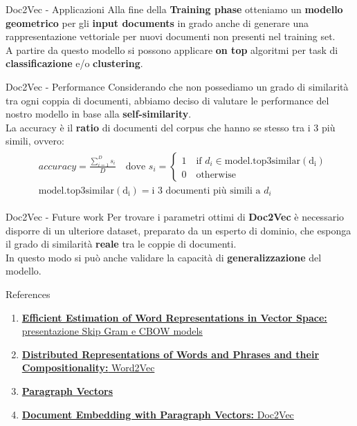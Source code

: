 \documentclass[british]{beamer}
\begin{document}
\begin{frame}{Doc2Vec - Applicazioni}
	Alla fine della \textbf{Training phase} otteniamo un \textbf{modello geometrico} per gli \textbf{input documents} in grado anche di generare una  rappresentazione vettoriale per nuovi documenti non presenti nel training set.\\
	A partire da questo modello si possono applicare \textbf{on top} algoritmi per task di \textbf{classificazione} e/o \textbf{clustering}. 
\end{frame}

\begin{frame}{Doc2Vec - Performance}
	Considerando che non possediamo un grado di similarit\`{a} tra ogni coppia di documenti, abbiamo deciso di valutare le performance del nostro modello in base alla \textbf{self-similarity}.\\
	La accuracy \`{e} il \textbf{ratio} di documenti del corpus che hanno se stesso tra i 3 pi\`{u} simili, ovvero:
	\begin{gather*}
	\begin{align*}
	&accuracy = \frac{\sum_{i=1}^{D} s_{i} }{D} \quad \text{dove } 
	s_{i}=\begin{cases}
	1 \quad \text{if } d_i \in 	\mathrm{model.top3similar(d_{i})}\\
	0 \quad \text{otherwise}
	\end{cases}\\
	&\mathrm{model.top3similar(d_{i})} =\text{i 3 documenti pi\`{u} simili a } d_{i}
	\end{align*}		
	\end{gather*}
	
\end{frame}

\begin{frame}{Doc2Vec - Future work}
	Per trovare i parametri ottimi di \textbf{Doc2Vec} \`{e} necessario disporre di un ulteriore dataset, preparato da un esperto di dominio, che esponga il grado di similarit\`{a} \textbf{reale} tra le coppie di documenti.\\
	In questo modo si pu\`{o} anche validare la capacit\`{a} di \textbf{generalizzazione} del modello.
\end{frame}

\begin{frame}{References}
	\begin{enumerate}
		\item \href{https://arxiv.org/pdf/1301.3781.pdf}{\textbf{Efficient Estimation of Word Representations in
			Vector Space:} presentazione Skip Gram e CBOW models}
		\item \href{https://papers.nips.cc/paper/5021-distributed-representations-of-words-and-phrases-and-their-compositionality.pdf}{\textbf{Distributed Representations of Words and Phrases
				and their Compositionality:} Word2Vec}
		\item \href{https://cs.stanford.edu/~quocle/paragraph_vector.pdf}{\textbf{Paragraph Vectors}}
		\item \href{https://arxiv.org/pdf/1507.07998.pdf}{\textbf{Document Embedding with Paragraph Vectors:} Doc2Vec}
	\end{enumerate}
\end{frame}
\end{document}
